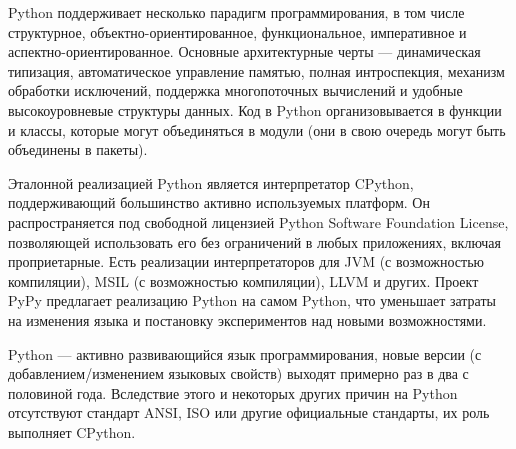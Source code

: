 Python поддерживает несколько парадигм программирования, в том числе структурное, объектно-ориентированное, функциональное, императивное и аспектно-ориентированное. Основные архитектурные черты — динамическая типизация, автоматическое управление памятью, полная интроспекция, механизм обработки исключений, поддержка многопоточных вычислений и удобные высокоуровневые структуры данных. Код в Python организовывается в функции и классы, которые могут объединяться в модули (они в свою очередь могут быть объединены в пакеты).

Эталонной реализацией Python является интерпретатор CPython, поддерживающий большинство активно используемых платформ. Он распространяется под свободной лицензией Python Software Foundation License, позволяющей использовать его без ограничений в любых приложениях, включая проприетарные. Есть реализации интерпретаторов для JVM (с возможностью компиляции), MSIL (с возможностью компиляции), LLVM и других. Проект PyPy предлагает реализацию Python на самом Python, что уменьшает затраты на изменения языка и постановку экспериментов над новыми возможностями.

Python — активно развивающийся язык программирования, новые версии (с добавлением/изменением языковых свойств) выходят примерно раз в два с половиной года. Вследствие этого и некоторых других причин на Python отсутствуют стандарт ANSI, ISO или другие официальные стандарты, их роль выполняет CPython.

